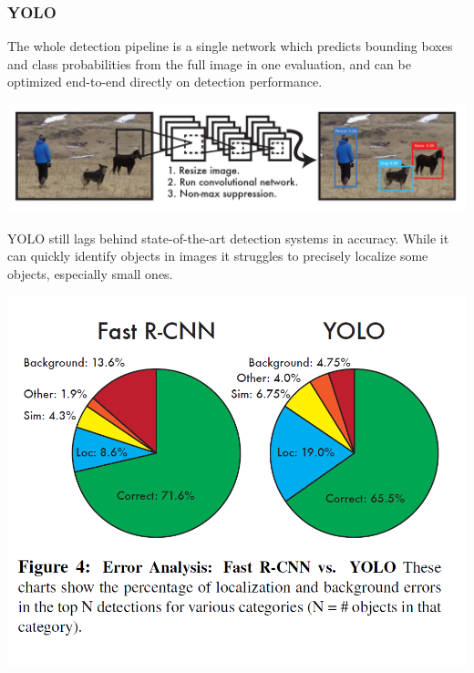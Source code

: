\begin{frame}[allowframebreaks]
\frametitle{YOLO}


\bigskip

The whole detection pipeline is a single network which predicts bounding boxes and class probabilities from the full image in one evaluation, and can be optimized end-to-end directly on detection performance.

\medskip

\begin{center}
	\includegraphics[scale=0.6]{figs/YOLO_structure}
\end{center}



\framebreak


YOLO still lags behind state-of-the-art detection systems
in accuracy. While it can quickly identify objects in images
it struggles to precisely localize some objects, especially
small ones.


\begin{center}
	\includegraphics[scale=0.6]{figs/error_YOLO_RCNN}
\end{center}




\end{frame}
